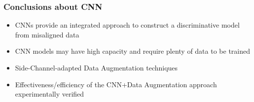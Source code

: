 \begin{frame}
\frametitle{Conclusions about CNN}

\begin{block}{}
\begin{itemize}
\item CNNs provide an integrated approach to construct a discriminative model from misaligned data \pause
\item CNN models may have high capacity and require plenty of data to be trained \pause 
\item Side-Channel-adapted Data Augmentation techniques \pause
\item Effectiveness/efficiency of the CNN+Data Augmentation approach experimentally verified
\end{itemize}
\end{block}

\end{frame}
